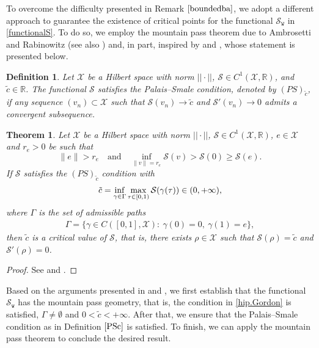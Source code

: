 \documentclass[12pt,reqno,a4paper]{amsart} %
\newtheorem{defi}{Definition}[section]
\numberwithin{equation}{section}
\numberwithin{figure}{section}
\newtheorem{theorem}{Theorem}[section]
\begin{document}
 
 To overcome the difficulty presented in Remark $\ref{boundedba}$, we adopt a different approach to guarantee the existence of critical points for the functional $\mathcal{S}_{\mathtt{W}}$ in \eqref{functionalS}. To do so, we employ the mountain pass theorem due to Ambrosetti and Rabinowitz \cite{ambrosetti} (see also \cite{willem}) and, in part, inspired by \cite{lecoz} and \cite{loreno1}, whose statement is presented below.
 
 \begin{defi}\label{PSc}
 	Let $ \mathcal{X}$ be a Hilbert space with norm $||\cdot||$,  $\mathcal{S}\in C^1( \mathcal{X}, \mathbb{R})$, and $\tilde{c}\in \mathbb{R}$. The functional $\mathcal{S}$ satisfies the Palais–Smale condition, denoted by $(PS)_{\tilde{c}}$, if any sequence $(v_n)\subset \mathcal{X}$ such that  $\mathcal{S}(v_n) \to\tilde{c}$ and $\mathcal{S}'(v_n) \to 0$ admits a convergent subsequence.
 \end{defi}
 
 \begin{theorem}\label{teo.Gordon}
 	Let $ \mathcal{X}$ be a Hilbert space with norm $||\cdot||$,  $\mathcal{S}\in C^1( \mathcal{X}, \mathbb{R})$, $e\in  \mathcal{X}$ and $r_e>0$ be such that
 	\begin{equation}\label{hip.Gordon}
 		\|e\|>r_e \quad \text{and} \quad 	 \inf_{\|v\|=r_e}\mathcal{S}(v)>\mathcal{S}(0)\ge \mathcal{S}(e). 
 	\end{equation}
 	If $\mathcal{S}$ satisfies the $(PS)_{\tilde{c}}$ condition with \begin{align}\label{tilde{c}}
 		\tilde{c}=\inf_{\gamma\in\Gamma}\max_{\tau\in[0,1)} \mathcal{S}(\gamma(\tau))\in (0,+\infty),
 	\end{align}where $\Gamma$ is the set of admissible paths\begin{align*}
 		\Gamma=\{\gamma\in C([0,1], \mathcal{X}): \ \gamma(0)=0, \ \gamma(1)=e\},
 	\end{align*}
 	then $\tilde{c}$ is a critical value of $\mathcal{S}$, that is, there exists $ \rho \in \mathcal{X}$ such that $\mathcal{S}(\rho)=\tilde{c}$ and $\mathcal{S}'(\rho)=0$. 
 \end{theorem}
 \begin{proof}
 	See \cite[Theorem 2.1]{ambrosetti} and \cite[Theorem 2.10]{willem}.
 \end{proof}
 
Based on the arguments presented in \cite{lecoz} and \cite{willem}, we first establish that the functional $\mathcal{S}_\mathtt{w}$ has the mountain pass geometry, that is, the condition in \eqref{hip.Gordon} is satisfied, $\Gamma \neq \emptyset$ and $0<\tilde{c}<+\infty$. After that, we ensure that the Palais–Smale condition as in Definition $\ref{PSc}$ is satisfied. To finish, we can apply the mountain pass theorem to conclude the desired result. 
 
\end{document}
